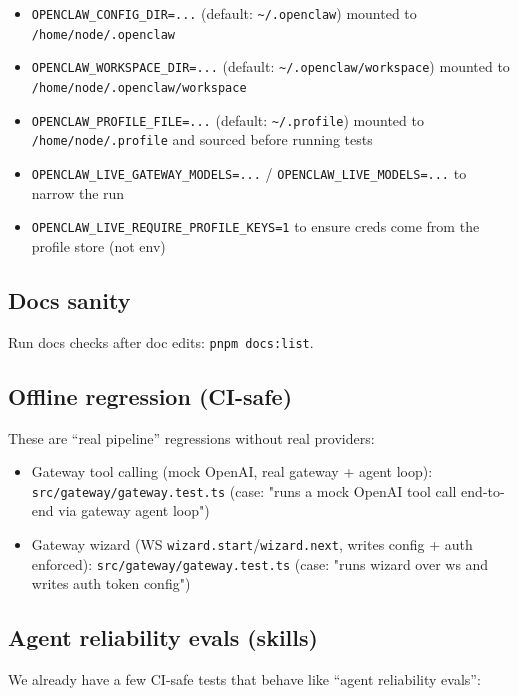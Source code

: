 \begin{itemize}
  \item \texttt{OPENCLAW\_CONFIG\_DIR=...} (default: \texttt{\textasciitilde{}/.openclaw}) mounted to \texttt{/home/node/.openclaw}
  \item \texttt{OPENCLAW\_WORKSPACE\_DIR=...} (default: \texttt{\textasciitilde{}/.openclaw/workspace}) mounted to \texttt{/home/node/.openclaw/workspace}
  \item \texttt{OPENCLAW\_PROFILE\_FILE=...} (default: \texttt{\textasciitilde{}/.profile}) mounted to \texttt{/home/node/.profile} and sourced before running tests
  \item \texttt{OPENCLAW\_LIVE\_GATEWAY\_MODELS=...} / \texttt{OPENCLAW\_LIVE\_MODELS=...} to narrow the run
  \item \texttt{OPENCLAW\_LIVE\_REQUIRE\_PROFILE\_KEYS=1} to ensure creds come from the profile store (not env)
\end{itemize}


\subsection{Docs sanity}


Run docs checks after doc edits: \texttt{pnpm docs:list}.

\subsection{Offline regression (CI-safe)}


These are “real pipeline” regressions without real providers:

\begin{itemize}
  \item Gateway tool calling (mock OpenAI, real gateway + agent loop): \texttt{src/gateway/gateway.test.ts} (case: "runs a mock OpenAI tool call end-to-end via gateway agent loop")
  \item Gateway wizard (WS \texttt{wizard.start}/\texttt{wizard.next}, writes config + auth enforced): \texttt{src/gateway/gateway.test.ts} (case: "runs wizard over ws and writes auth token config")
\end{itemize}


\subsection{Agent reliability evals (skills)}


We already have a few CI-safe tests that behave like “agent reliability evals”:

